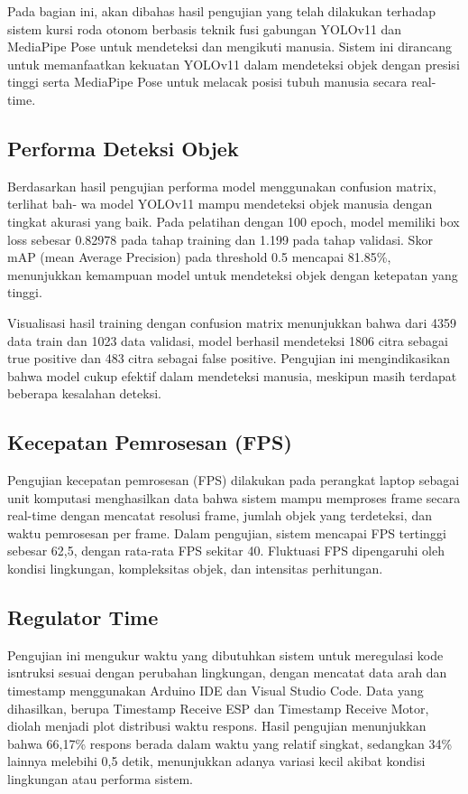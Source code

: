 Pada bagian ini, akan dibahas hasil pengujian yang telah dilakukan terhadap sistem kursi roda otonom berbasis teknik fusi gabungan YOLOv11 dan MediaPipe Pose untuk mendeteksi dan mengikuti manusia. Sistem ini dirancang untuk memanfaatkan kekuatan YOLOv11 dalam mendeteksi objek dengan presisi tinggi serta MediaPipe Pose untuk melacak posisi tubuh manusia secara real-time.

\subsection{Performa Deteksi Objek}
\label{sec:performadeteksiobjek}

Berdasarkan hasil pengujian performa model menggunakan confusion matrix, terlihat bah- wa model YOLOv11 mampu mendeteksi objek manusia dengan tingkat akurasi yang baik. Pada pelatihan dengan 100 epoch, model memiliki box loss sebesar 0.82978 pada tahap training dan 1.199 pada tahap validasi. Skor mAP (mean Average Precision) pada threshold 0.5 mencapai 81.85\%, menunjukkan kemampuan model untuk mendeteksi objek dengan ketepatan yang tinggi.

Visualisasi hasil training dengan confusion matrix menunjukkan bahwa dari 4359 data train dan 1023 data validasi, model berhasil mendeteksi 1806 citra sebagai true positive dan 483 citra sebagai false positive. Pengujian ini mengindikasikan bahwa model cukup efektif dalam mendeteksi manusia, meskipun masih terdapat beberapa kesalahan deteksi.

\subsection{Kecepatan Pemrosesan (FPS)}
\label{sec:kecepatanpemrosesan}

Pengujian kecepatan pemrosesan (FPS) dilakukan pada perangkat laptop sebagai unit komputasi menghasilkan data bahwa sistem mampu memproses frame secara real-time dengan mencatat resolusi frame, jumlah objek yang terdeteksi, dan waktu pemrosesan per frame. Dalam pengujian, sistem mencapai FPS tertinggi sebesar 62,5, dengan rata-rata FPS sekitar 40. Fluktuasi FPS dipengaruhi oleh kondisi lingkungan, kompleksitas objek, dan intensitas perhitungan.

\subsection{Regulator Time}
\label{sec:regulatortime}

Pengujian ini mengukur waktu yang dibutuhkan sistem untuk meregulasi kode isntruksi sesuai dengan perubahan lingkungan, dengan mencatat data arah dan timestamp menggunakan Arduino IDE dan Visual Studio Code. Data yang dihasilkan, berupa Timestamp Receive ESP dan Timestamp Receive Motor, diolah menjadi plot distribusi waktu respons. Hasil pengujian menunjukkan bahwa 66,17\% respons berada dalam waktu yang relatif singkat, sedangkan 34\% lainnya melebihi 0,5 detik, menunjukkan adanya variasi kecil akibat kondisi lingkungan atau performa sistem.

